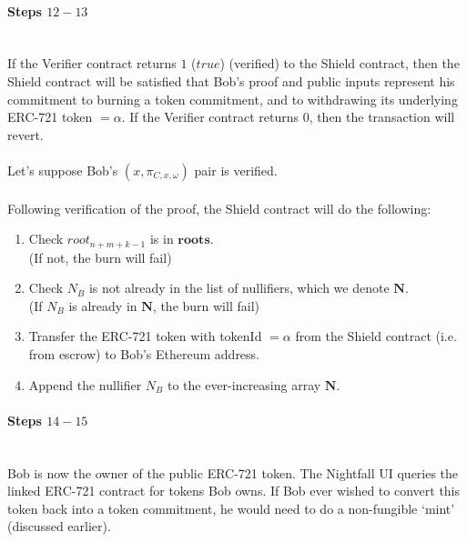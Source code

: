 \documentclass{article}
\begin{document}
\paragraph{Steps $12 - 13$}
\ \\
If the Verifier contract returns $1$ ($true$) (verified) to the Shield contract, then the Shield contract will be satisfied that Bob's proof and public inputs represent his commitment to burning a token commitment, and to withdrawing its underlying ERC-721 token $=\alpha$. If the Verifier contract returns $0$, then the transaction will revert.\\
\\
Let's suppose Bob's $(x, \pi_{C,x,\omega})$ pair is verified.\\
\\
Following verification of the proof, the Shield contract will do the following:
\begin{enumerate}
  \item Check $root_{n+m+k-1}$ is in $\bm{roots}$.\\
    (If not, the burn will fail)
  \item Check $N_B$ is not already in the list of nullifiers, which we denote $\bm{N}$.\\
    (If $N_B$ is already in $\bm{N}$, the burn will fail)
  \item Transfer the ERC-721 token with tokenId $=\alpha$ from the Shield     contract (i.e. from escrow) to Bob's Ethereum address.
  \item Append the nullifier $N_{B}$ to the ever-increasing array $\bm N$.
\end{enumerate}


\paragraph{Steps $14 - 15$}
\ \\
Bob is now the owner of the public ERC-721 token. The Nightfall UI queries the linked ERC-721 contract for tokens Bob owns.
If Bob ever wished to convert this token back into a token commitment, he would need to do a non-fungible `mint' (discussed earlier).
\end{document}
